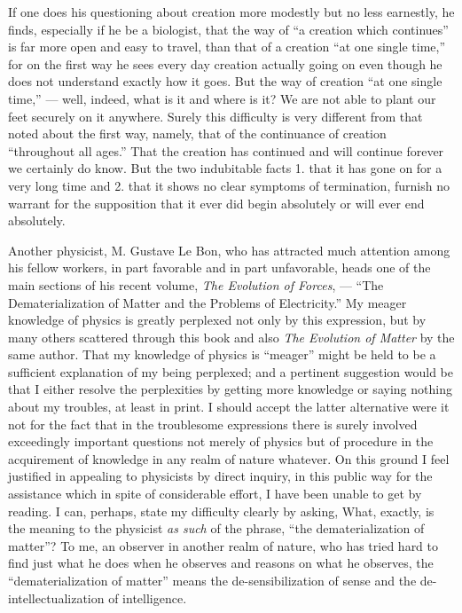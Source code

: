 \documentclass[a4paper, 11pt, oneside, polutonikogreek, english]{article}
\begin{document}
If one does his questioning about creation more modestly but no less earnestly, he finds, especially if he be a biologist, that the way of ``a creation which continues'' is far more open and easy to travel, than that of a creation ``at one single time,'' for on the first way he sees every day creation actually going on even though he does not understand exactly how it goes. But the way of creation ``at one single time,'' --- well, indeed, what is it and where is it? We are not able to plant our feet securely on it anywhere. Surely this difficulty is very different from that noted about the first way, namely, that of the continuance of creation ``throughout all ages.'' That the creation has continued and will continue forever we certainly do know. But the two indubitable facts 1. that it has gone on for a very long time and 2. that it shows no clear symptoms of termination, furnish no warrant for the supposition that it ever did begin absolutely or will ever end absolutely.

Another physicist, M. Gustave Le Bon, who has attracted much attention among his fellow workers, in part favorable and in part unfavorable, heads one of the main sections of his recent volume, \emph{The Evolution of Forces}, --- ``The Dematerialization of Matter and the Problems of Electricity.'' My meager knowledge of physics is greatly perplexed not only by this expression, but by many others scattered through this book and also \emph{The Evolution of Matter} by the same author. That my knowledge of physics is ``meager'' might be held to be a sufficient explanation of my being perplexed; and a pertinent suggestion would be that I either resolve the perplexities by getting more knowledge or saying nothing about my troubles, at least in print. I should accept the latter alternative were it not for the fact that in the troublesome expressions there is surely involved exceedingly important questions not merely of physics but of procedure in the acquirement of knowledge in any realm of nature whatever. On this ground I feel justified in appealing to physicists by direct inquiry, in this public way for the assistance which in spite of considerable effort, I have been unable to get by reading. I can, perhaps, state my difficulty clearly by asking, What, exactly, is the meaning to the physicist \emph{as such} of the phrase, ``the dematerialization of matter''? To me, an observer in another realm of nature, who has tried hard to find just what he does when he observes and reasons on what he observes, the ``dematerialization of matter'' means the de-sensibilization of sense and the de-intellectualization of intelligence.
\end{document}
